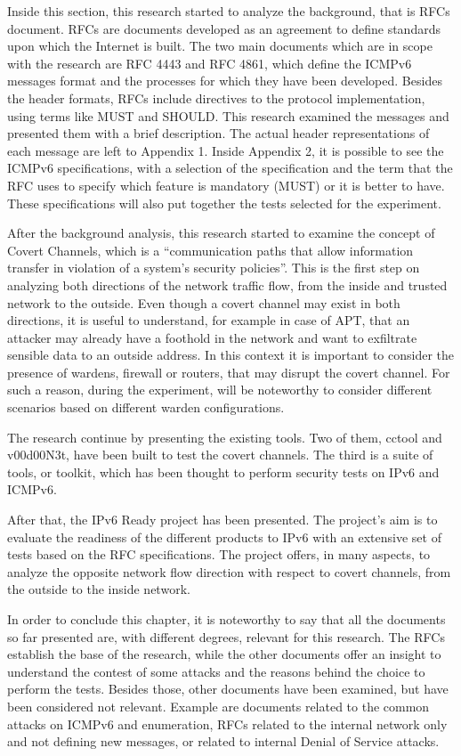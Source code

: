 \documentclass[12pt]{article}
\begin{document}
Inside this section, this research started to analyze the background, that is RFCs document. RFCs are documents developed as an agreement to define standards upon which the Internet is built. The two main documents which are in scope with the research are RFC 4443 and RFC 4861, which define the ICMPv6 messages format and the processes for which they have been developed. Besides the header formats, RFCs include directives to the protocol implementation, using terms like MUST and SHOULD. This research examined the messages and presented them with a brief description. The actual header representations of each message are left to Appendix 1. Inside Appendix 2, it is possible to see the ICMPv6 specifications, with a selection of the specification and the term that the RFC uses to specify which feature is mandatory (MUST) or it is better to have. These specifications will also put together the tests selected for the experiment.

After the background analysis, this research started to examine the concept of Covert Channels, which is a ``communication paths that allow information transfer in violation of a system’s security policies''. This is the first step on analyzing both directions of the network traffic flow, from the inside and trusted network to the outside. Even though a covert channel may exist in both directions, it is useful to understand, for example in case of APT, that an attacker may already have a foothold in the network and want to exfiltrate sensible data to an outside address. In this context it is important to consider the presence of wardens, firewall or routers, that may disrupt the covert channel. For such a reason, during the experiment, will be noteworthy to consider different scenarios based on different warden configurations.

The research continue by presenting the existing tools. Two of them, cctool and v00d00N3t, have been built to test the covert channels. The third is a suite of tools, or toolkit, which has been thought to perform security tests on IPv6 and ICMPv6.

After that, the IPv6 Ready project has been presented. The project's aim is to evaluate the readiness of the different products to IPv6 with an extensive set of tests based on the RFC specifications. The project offers, in many aspects, to analyze the opposite network flow direction with respect to covert channels, from the outside to the inside network.

In order to conclude this chapter, it is noteworthy to say that all the documents so far presented are, with different degrees, relevant for this research. The RFCs establish the base of the research, while the other documents offer an insight to understand the contest of some attacks and the reasons behind the choice to perform the tests. Besides those, other documents have been examined, but have been considered not relevant. Example are documents related to the common attacks on ICMPv6 and enumeration\cite{sans}, RFCs related to the internal network only and not defining new messages\cite{rfc4862}, or related to internal Denial of Service 
attacks\cite{smurf}.
\end{document}
